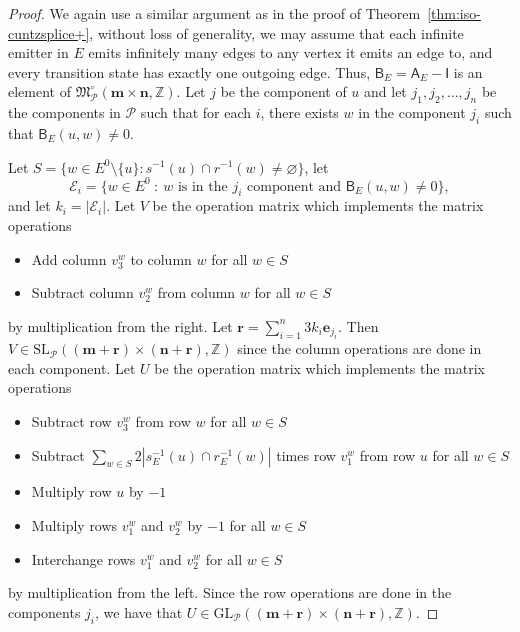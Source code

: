 \documentclass[12pt]{amsbook}%
\theoremstyle{defin}
\theoremstyle{remark}
\numberwithin{equation}{chapter}
\numberwithin{theor}{section}
\newcommand{\ZZ}{\mathbb{Z}}
\renewcommand{\emptyset}{\varnothing}
\begin{document}
\begin{proof}
We again use a similar argument as in the proof of Theorem~\ref{thm:iso-cuntzsplice+}, without loss of generality, we may assume that each infinite emitter in $E$ emits infinitely many edges to any vertex it emits an edge to, and every transition state has exactly one outgoing edge.  Thus, $\mathsf{B}_E = \mathsf{A}_E - \mathsf{I}$ is an element of $\mathfrak{M}_{\mathcal{P}}^\circ ( \mathbf{m} \times \mathbf{n} , \ZZ )$.  Let $j$ be the component of $u$ and let $j_1, j_2, \ldots, j_n$ be the components in $\mathcal{P}$ such that for each $i$, there exists $w$ in the component $j_i$ such that $\mathsf{B}_E ( u, w ) \neq 0$.  

Let $S = \{ w \in E^0 \setminus \{u\} : s^{-1}(u) \cap r^{-1}(w) \neq \emptyset \}$, let 
\[
\mathcal{E}_i = \{ w \in E^0 \ : \ \text{$w$ is in the $j_i$ component and $\mathsf{B}_E ( u, w ) \neq 0$} \},
\]
and let $k_i = |\mathcal{E}_i |$.  Let $V$ be the operation matrix which implements the matrix operations
\begin{itemize}
\item Add column $v_3^w$ to column $w$ for all $w \in S$
\item Subtract column $v_2^w$ from column $w$ for all $w \in S$
\end{itemize}
 by multiplication from the right.
Let $\mathbf{r} = \sum_{ i = 1 }^n 3 k_i\mathbf{e}_{j_i}$.  Then $V \in \mathrm{SL}_{\mathcal{P}} ( ( \mathbf{m} + \mathbf{r}) \times (\mathbf{n} + \mathbf{r} ) , \ZZ )$ since the column operations are done in each component.  Let $U$ be the operation matrix which implements the matrix operations
\begin{itemize}
\item Subtract row $v_3^w$ from row $w$ for all $w \in S$
\item Subtract $\sum_{w\in S}2|s^{-1}_E(u)\cap  r^{-1}_E(w)|$ times row $v^w_1$ from row $u$ for all $w \in S$
\item Multiply row $u$ by $-1$
\item Multiply rows $v^w_1$ and $v^w_2$ by $-1$ for all $w \in S$
\item Interchange rows $v_1^w$ and  $v_2^w$ for all $w \in S$
\end{itemize}
by multiplication from the left. Since the row operations are done in the components $j_i$, we have that $U \in \mathrm{GL}_{\mathcal{P}} (( \mathbf{m} + \mathbf{r}) \times (\mathbf{n} +  \mathbf{r} ) , \ZZ )$.  


\end{proof}
\end{document}
